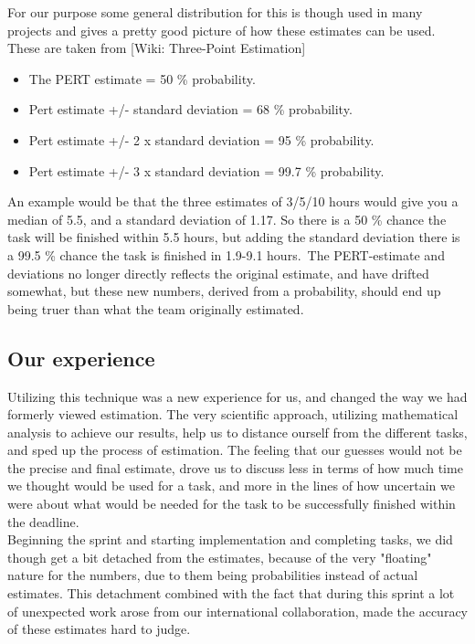 For our purpose some general distribution for this is though used in many projects and gives a pretty good picture of how these estimates can be used. These are taken from [Wiki: Three-Point Estimation]\
\begin{itemize}

\item The PERT estimate = 50 \% probability.
\item Pert estimate +/- standard deviation = 68 \% probability.
\item Pert estimate +/- 2 x standard deviation = 95 \% probability.
\item Pert estimate +/- 3 x standard deviation = 99.7 \% probability.
\end{itemize}
An example would be that the three estimates of 3/5/10 hours would give you a median of 5.5, and a standard deviation of 1.17. So there is a 50 \% chance the task will be finished within 5.5 hours, but adding the standard deviation there is a 99.5 \% chance the task is finished in 1.9-9.1 hours.\
The PERT-estimate and deviations no longer directly reflects the original estimate, and have drifted somewhat, but these new numbers, derived from a probability, should end up being truer than what the team originally estimated. \\



\subsection{Our experience}
Utilizing this technique was a new experience for us, and changed the way we had formerly viewed estimation. The very scientific approach, utilizing mathematical analysis to achieve our results, help us to distance ourself from the different tasks, and sped up the process of estimation. The feeling that our guesses would not be the precise and final estimate, drove us to discuss less in terms of how much time we thought would be used for a task, and more in the lines of how uncertain we were about what would be needed for the task to be successfully finished within the deadline. \\

Beginning the sprint and starting implementation and completing tasks, we did though get a bit detached from the estimates, because of the very "floating" nature for the numbers, due to them being probabilities instead of actual estimates. This detachment combined with the fact that during this sprint a lot of unexpected work arose from our international collaboration, made the accuracy of these estimates hard to judge. \\

